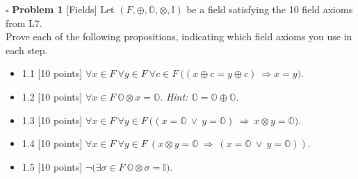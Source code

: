 \documentclass[11pt]{article}
\numberwithin{equation}{section}
\DeclareMathOperator*{\+}{\oplus}
\begin{document}
   \noindent $\square$ \textbf{Problem 1}  [\textsf{Fields}] Let $(F, \oplus , \mathbb{O}, \otimes, \mathbb{I})$ be a field satisfying the 10 field axioms from \textsf{L7}. \\
   Prove each of the following propositions, indicating which field axioms you use in each step.\begin{itemize}
  \itemsep0em 
        \item 1.1 [10 points] $\forall x \in F \ \forall y \in F \ \forall c \in F \ \Big ( (x \oplus c = y \oplus c) \ \Rightarrow x=y \Big ) $.
   \item 1.2 [10 points] $\forall x \in F \ \mathbb{O} \otimes x = \mathbb{O}$.  \textit{Hint: $\mathbb{O} = \mathbb{O} \oplus \mathbb{O}$.}
      \item 1.3 [10 points] $\forall x \in F \ \forall y \in F \ \Big ( (x = \mathbb{O} \ \lor \ y = \mathbb{O})  \ \Rightarrow \ x \otimes y = \mathbb{O} \Big ) $.
   \item 1.4 [10 points] $\forall x \in F \ \forall y \in F \ (x \otimes y = \mathbb{O}   \ \Rightarrow \ (x = \mathbb{O} \ \lor \ y = \mathbb{O}))$.
   \item 1.5 [10 points] $\neg \Big ( \exists \sigma \in F \ \mathbb{O} \otimes \sigma= \mathbb{I} \Big ) $.
   \end{itemize}
\medskip 
\end{document}
